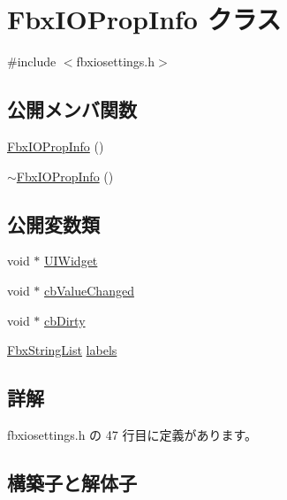 \hypertarget{class_fbx_i_o_prop_info}{}\section{Fbx\+I\+O\+Prop\+Info クラス}
\label{class_fbx_i_o_prop_info}


{\ttfamily \#include $<$fbxiosettings.\+h$>$}

\subsection*{公開メンバ関数}
\begin{DoxyCompactItemize}
\item 
\hyperlink{class_fbx_i_o_prop_info_a2e822ebff7eec7cd53055c1e333c9db3}{Fbx\+I\+O\+Prop\+Info} ()
\item 
\hyperlink{class_fbx_i_o_prop_info_a1cf2524e902186c660c765a5069a9660}{$\sim$\+Fbx\+I\+O\+Prop\+Info} ()
\end{DoxyCompactItemize}
\subsection*{公開変数類}
\begin{DoxyCompactItemize}
\item 
void $\ast$ \hyperlink{class_fbx_i_o_prop_info_a2ea012986e65addbf7ae8cb3db723b7c}{U\+I\+Widget}
\item 
void $\ast$ \hyperlink{class_fbx_i_o_prop_info_a721a79e80d25c2e5d904fa6e285df8b6}{cb\+Value\+Changed}
\item 
void $\ast$ \hyperlink{class_fbx_i_o_prop_info_ad1102a1aa9802f26a71df9aeb7033de7}{cb\+Dirty}
\item 
\hyperlink{class_fbx_string_list}{Fbx\+String\+List} \hyperlink{class_fbx_i_o_prop_info_adee0d1340eefab937fe4af63e8172c53}{labels}
\end{DoxyCompactItemize}


\subsection{詳解}


 fbxiosettings.\+h の 47 行目に定義があります。



\subsection{構築子と解体子}
\mbox{\label{class_fbx_i_o_prop_info_a2e822ebff7eec7cd53055c1e333c9db3}} 
